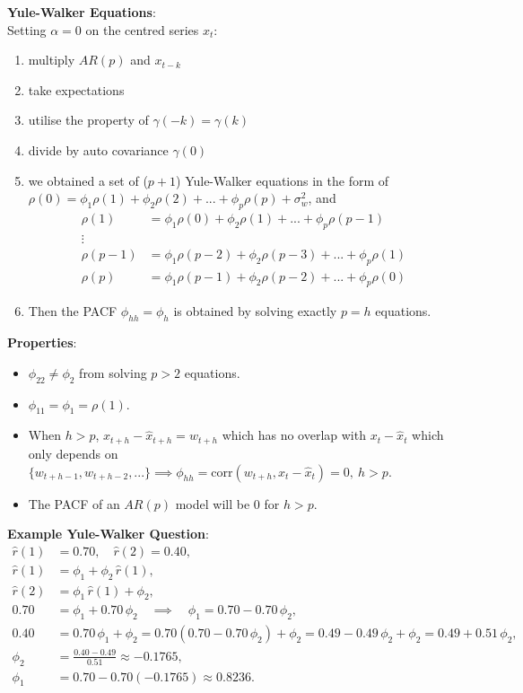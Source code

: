 \documentclass[11pt]{article}
\newcommand{\noi}{\noindent}
\begin{document}
\noi \textbf{Yule-Walker Equations}: \\
\noi Setting $\alpha = 0$ on the centred series $x_t$:
\begin{enumerate}
    \item multiply $AR(p)$ and $x_{t-k}$
    \item take expectations
    \item utilise the property of $\gamma(-k) = \gamma(k)$
    \item divide by auto covariance $\gamma(0)$
    \item we obtained a set of ($p+1$) Yule-Walker equations in the form of $\rho(0) = \phi_1\rho(1) + \phi_2\rho(2) + ... + \phi_p \rho(p) + \sigma_w^2$, and \begin{align*}
        \rho(1) &= \phi_1 \rho(0) + \phi_2 \rho(1) + ... + \phi_{p}\rho(p-1) \\
        \vdots& \\
        \rho(p-1) &= \phi_1\rho(p-2) + \phi_2 \rho(p-3) + ... + \phi_p \rho(1) \\
        \rho(p) &= \phi_1 \rho(p-1) + \phi_2 \rho(p-2) + ... + \phi_p \rho(0)
    \end{align*}
    \item Then the PACF $\phi_{hh} = \phi_h$ is obtained by solving exactly $p=h$ equations.
\end{enumerate} \phantom{i}

\noi \textbf{Properties}:
\begin{itemize}
    \item $\phi_{22} \neq \phi_2$ from solving $p > 2$ equations.
    \item $\phi_{11} = \phi_1 = \rho(1)$.
    \item When $h > p$, $x_{t+h} - \hat{x}_{t+h} = w_{t+h}$ which has no overlap with $x_{t} - \hat{x}_t$ which only depends on $\{w_{t+h-1}, w_{t+h-2},...\} \implies \phi_{hh} = \text{corr}(w_{t+h}, x_t - \hat{x}_t) = 0, \: h> p$.
    \item The PACF of an $AR(p)$ model will be $0$ for $h > p$.
\end{itemize} \phantom{i}

\noi \textbf{Example Yule-Walker Question}:
\begin{align*}
\hat r(1)&=0.70,\quad \hat r(2)=0.40,\\
\hat r(1)&=\phi_1+\phi_2\,\hat r(1),\\
\hat r(2)&=\phi_1\,\hat r(1)+\phi_2,\\
0.70&=\phi_1+0.70\,\phi_2\quad\implies\quad\phi_1=0.70-0.70\,\phi_2,\\
0.40&=0.70\,\phi_1+\phi_2
=0.70(0.70-0.70\,\phi_2)+\phi_2
=0.49-0.49\,\phi_2+\phi_2
=0.49+0.51\,\phi_2,\\
\phi_2&=\frac{0.40-0.49}{0.51}\approx -0.1765,\\
\phi_1&=0.70-0.70(-0.1765)\approx 0.8236.
\end{align*}
\end{document}
